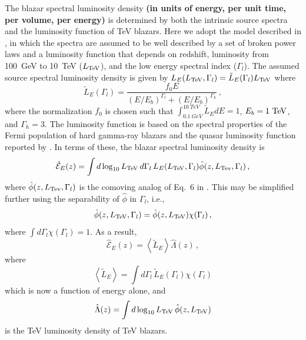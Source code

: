 \documentclass[numberedappendix]{emulateapj}
\newcommand\ALc[1]{{\color{red} \bf #1}} %
\begin{document}
The blazar spectral luminosity density \ALc{(in units of energy, per unit time, per volume, per energy)} is determined by both the
intrinsic source spectra and the luminosity function of TeV blazars.
Here we adopt the model described in \citet{2014ApJ...790..137B}, in
which the spectra are assumed to be well described by a set of broken
power laws and a luminosity function that depends on redshift,
luminosity from 100~GeV to 10~TeV ($L_{\rm TeV}$), and the low energy
spectral index ($\Gamma_l$).  The assumed source spectral luminosity
density is given by 
$L_E(L_{\rm TeV},\Gamma_l)=\tilde{L}_E(\Gamma_l) L_{\rm TeV}$ where
\begin{equation}
\label{eq:intrinsic_spectrum}
\tilde{L}_E(\Gamma_l) = \frac{f_0 E}{(E/E_b)^{\Gamma_l} + (E/E_b)^{\Gamma_h}}\,,
\end{equation}
where the normalization $f_0$ is chosen such that 
$\int_{0.1~GeV}^{10~TeV} \tilde{L}_E dE = 1$, $E_b=1~{\rm TeV}$, and
$\Gamma_h=3$.  The luminosity function is based on the spectral
properties of the Fermi population of hard gamma-ray blazars and the
quasar luminosity function reported by \citet{2007ApJ...654..731H}.
In terms of these, the blazar spectral luminosity density is
\begin{equation}\label{eq:spec_lum_dens}
\hat{\mathcal{E}}_E(z)
=
\int d\log_{10}L_{\rm TeV}\,d\Gamma_l\, L_E(L_{\rm TeV},\Gamma_l)
\hat{\phi}(z,L_{\rm Tev},\Gamma_l)\,,
\end{equation}
where $\hat{\phi}(z,L_{\rm Tev},\Gamma_l)$ is the comoving analog of Eq.~6 in \citet{2014ApJ...790..137B}.  This may be simplified
further using the separability of $\hat{\phi}$ in $\Gamma_l$, i.e.,
\begin{equation}
\hat{\phi}(z,L_{\rm TeV},\Gamma_l)
=
\hat{\phi}(z,L_{\rm TeV})
\chi(\Gamma_l)\,,
\end{equation}
where $\int d\Gamma_l \chi(\Gamma_l) = 1$.  As a result,
\begin{equation}
\label{eq:mean_heat}
\hat{\mathcal{E}}_E(z)
=
\left< \tilde{L}_E \right>
\hat{\Lambda}(z)\,,
\end{equation}
where
\begin{equation}
\left< \tilde{L}_E \right>
=
\int d\Gamma_l\,\tilde{L}_E(\Gamma_l) \chi(\Gamma_l)
\end{equation}
which is now a function of energy alone, and
\begin{equation}
\hat{\Lambda}(z) = 
\int d\log_{10}L_{\rm TeV}\,\hat{\phi}(z,L_{\rm TeV})
\end{equation}
is the TeV luminosity density of TeV blazars.  
\end{document}
